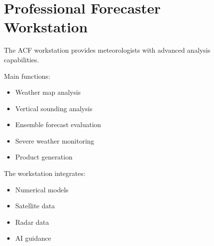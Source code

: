 \section{Professional Forecaster Workstation}


The ACF workstation provides meteorologists with advanced
analysis capabilities.



Main functions:


\begin{itemize}

\item Weather map analysis

\item Vertical sounding analysis

\item Ensemble forecast evaluation

\item Severe weather monitoring

\item Product generation

\end{itemize}



The workstation integrates:


\begin{itemize}

\item Numerical models

\item Satellite data

\item Radar data

\item AI guidance

\end{itemize}
